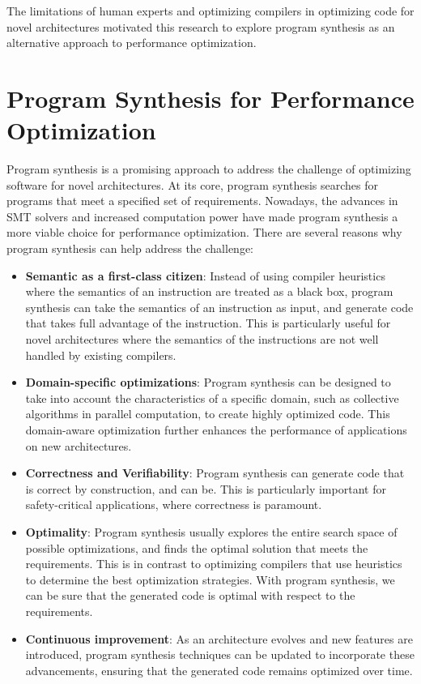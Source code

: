 The limitations of human experts and optimizing compilers in
optimizing code for novel architectures motivated this research
to explore program synthesis as an alternative approach to
performance optimization.

\section{Program Synthesis for Performance Optimization}

Program synthesis is a promising approach to address the challenge of
optimizing software for novel architectures.
%
At its core, program synthesis searches for programs that meet a
specified set of requirements.
%
Nowadays, the advances in SMT solvers and increased computation power
have made program synthesis a more viable choice for performance optimization.
%
There are several reasons why program synthesis can help address the
challenge:

\begin{itemize}
    \item \textbf{Semantic as a first-class citizen}: Instead of using
    compiler heuristics where the semantics of an instruction are treated
    as a black box, program synthesis can take the semantics of an
    instruction as input, and generate code that takes full advantage
    of the instruction. This is particularly useful for novel
    architectures where the semantics of the instructions are not well
    handled by existing compilers.

    \item \textbf{Domain-specific optimizations}: Program synthesis
    can be designed to take into account the characteristics of a
    specific domain, such as collective algorithms in parallel
    computation, to create highly optimized code.
    This domain-aware optimization further enhances the performance of
    applications on new architectures.

    \item \textbf{Correctness and Verifiability}: Program synthesis
    can generate code that is correct by construction, and can be.
    This is particularly important for safety-critical applications,
    where correctness is paramount.

    \item \textbf{Optimality}: Program synthesis usually explores the
    entire search space of possible optimizations, and finds the
    optimal solution that meets the requirements. This is in contrast
    to optimizing compilers that use heuristics to determine the best
    optimization strategies. With program synthesis, we can be sure
    that the generated code is optimal with respect to the
    requirements.

    \item \textbf{Continuous improvement}: As an architecture evolves
    and new features are introduced, program synthesis techniques can
    be updated to incorporate these advancements, ensuring that the
    generated code remains optimized over time.
\end{itemize}

